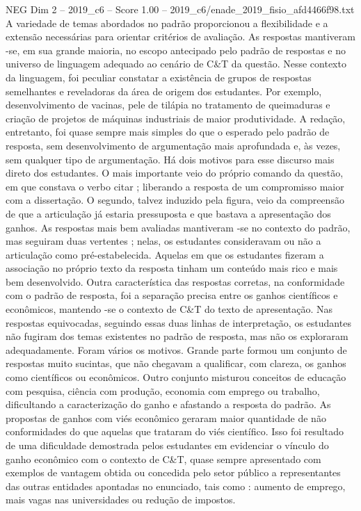 \begin{textsample}{NEG Dim 2 – 2019\_c6 – Score 1.00 – 2019\_c6/enade\_2019\_fisio\_afd4466f98.txt}
A variedade de temas abordados no padrão proporcionou a flexibilidade e a extensão necessárias para orientar critérios de avaliação.
As respostas mantiveram -se, em sua grande maioria, no escopo antecipado pelo padrão de respostas e no universo de linguagem adequado ao cenário de C\&T da questão.
Nesse contexto da linguagem, foi peculiar constatar a existência de grupos de respostas semelhantes e reveladoras da área de origem dos estudantes.
Por exemplo, desenvolvimento de vacinas, pele de tilápia no tratamento de queimaduras e criação de projetos de máquinas industriais de maior produtividade.
A redação, entretanto, foi quase sempre mais simples do que o esperado pelo padrão de resposta, sem desenvolvimento de argumentação mais aprofundada e, às vezes, sem qualquer tipo de argumentação.
Há dois motivos para esse discurso mais direto dos estudantes.
O mais importante veio do próprio comando da questão, em que constava o verbo citar ; liberando a resposta de um compromisso maior com a dissertação.
O segundo, talvez induzido pela figura, veio da compreensão de que a articulação já estaria pressuposta e que bastava a apresentação dos ganhos.
As respostas mais bem avaliadas mantiveram -se no contexto do padrão, mas seguiram duas vertentes ; nelas, os estudantes consideravam ou não a articulação como pré-estabelecida.
Aquelas em que os estudantes fizeram a associação no próprio texto da resposta tinham um conteúdo mais rico e mais bem desenvolvido.
Outra característica das respostas corretas, na conformidade com o padrão de resposta, foi a separação precisa entre os ganhos científicos e econômicos, mantendo -se o contexto de C\&T do texto de apresentação.
Nas respostas equivocadas, seguindo essas duas linhas de interpretação, os estudantes não fugiram dos temas existentes no padrão de resposta, mas não os exploraram adequadamente.
Foram vários os motivos.
Grande parte formou um conjunto de respostas muito sucintas, que não chegavam a qualificar, com clareza, os ganhos como científicos ou econômicos.
Outro conjunto misturou conceitos de educação com pesquisa, ciência com produção, economia com emprego ou trabalho, dificultando a caracterização do ganho e afastando a resposta do padrão.
As propostas de ganhos com viés econômico geraram maior quantidade de não conformidades do que aquelas que trataram do viés científico.
Isso foi resultado de uma dificuldade demostrada pelos estudantes em evidenciar o vínculo do ganho econômico com o contexto de C\&T, quase sempre apresentado com exemplos de vantagem obtida ou concedida pelo setor público a representantes das outras entidades apontadas no enunciado, tais como : aumento de emprego, mais vagas nas universidades ou redução de impostos.

\end{textsample}
